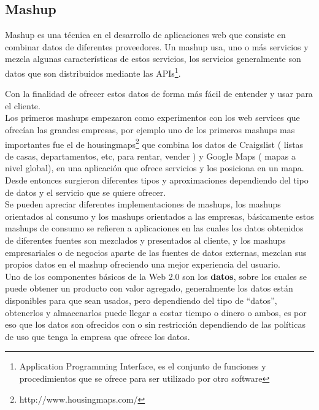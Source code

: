 
    \subsection{Mashup} %
    \label{sub:mashup}
      Mashup es una técnica en el desarrollo de aplicaciones web que consiste en 
      combinar datos de diferentes proveedores. Un mashup usa, uno o más servicios 
      y mezcla algunas características de estos servicios, los servicios generalmente 
      son datos que son distribuidos mediante las APIs\footnote{Application 
      Programming Interface, es el conjunto de funciones y procedimientos que se 
      ofrece para ser utilizado por otro software}. 

      Con la finalidad de ofrecer 
      estos datos de forma más fácil de entender y usar para el cliente.\\

      Los primeros mashups empezaron como experimentos con los web services que 
      ofrec\'ian las grandes empresas, por ejemplo uno de los primeros mashups mas
      importantes fue el de housingmaps\footnote{http://www.housingmaps.com/}  
      que combina los datos de Craigslist ( listas de casas, departamentos, etc, para rentar, vender ) 
      y Google Maps ( mapas a nivel global), en una aplicaci\'on que ofrece servicios y los 
      posiciona en un mapa. Desde entonces surgieron diferentes tipos y aproximaciones 
      dependiendo del tipo de datos y el servicio que se quiere ofrecer.\cite{web8}\\

      Se pueden apreciar diferentes implementaciones de mashups, los mashups 
      orientados al consumo y los mashups orientados a las empresas, básicamente 
      estos mashups de consumo se refieren a aplicaciones en las cuales los datos 
      obtenidos de diferentes fuentes son mezclados y presentados al cliente, 
      y los mashups empresariales o de negocios aparte de las fuentes de datos 
      externas, mezclan sus propios datos en el mashup ofreciendo una mejor experiencia del usuario.\\

      Uno de los componentes básicos de la Web 2.0 son los \textbf{datos},\cite{web5} 
      sobre los cuales se puede obtener un producto con valor agregado, 
      generalmente los datos están disponibles para que sean usados, pero
      dependiendo del tipo de ``datos'', obtenerlos y almacenarlos puede llegar a costar 
      tiempo o dinero o ambos, es por eso que los datos son ofrecidos con o sin 
      restricción dependiendo de las políticas de uso que tenga la empresa que ofrece los datos.\\

